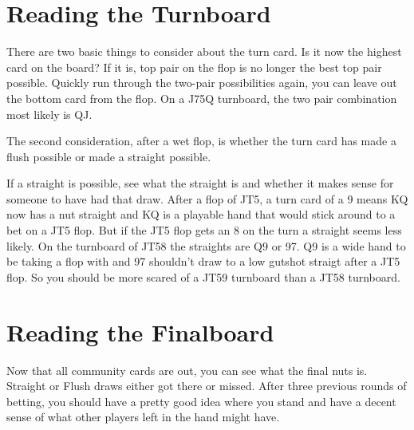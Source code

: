\section{Reading the Turnboard}

There are two basic things to consider about the turn card. Is it
now the highest card on the board? If it is, top pair on the flop is
no longer the best top pair possible. Quickly run through the two-pair
possibilities again, you can leave out the bottom card from the flop.
On a J75Q turnboard, the two pair combination most likely is QJ.

The second consideration, after a wet flop, is whether the turn card
has made a flush possible or made a straight possible.

If a straight is possible, see what the straight is and whether it
makes sense for someone to have had that draw. After a flop of JT5, a
turn card of a 9 means KQ now has a nut straight and KQ is a playable
hand that would stick around to a bet on a JT5 flop. But if the JT5
flop gets an 8 on the turn a straight seems less likely. On the
turnboard of JT58 the straights are Q9 or 97. Q9 is a wide hand to be
taking a flop with and 97 shouldn't draw to a low gutshot straigt
after a JT5 flop. So you should be more scared of a JT59 turnboard
than a JT58 turnboard.

\section{Reading the Finalboard}

Now that all community cards are out, you can see what the final nuts
is. Straight or Flush draws either got there or missed. After three
previous rounds of betting, you should have a pretty good idea where
you stand and have a decent sense of what other players left in the
hand might have.
